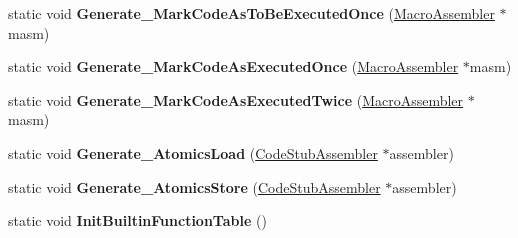 \begin{DoxyCompactItemize}
\item 
static void {\bfseries Generate\+\_\+\+Mark\+Code\+As\+To\+Be\+Executed\+Once} (\hyperlink{classv8_1_1internal_1_1_macro_assembler}{Macro\+Assembler} $\ast$masm)\hypertarget{classv8_1_1internal_1_1_builtins_a91a3f20e92eb67a9dd683c2821a882f8}{}\label{classv8_1_1internal_1_1_builtins_a91a3f20e92eb67a9dd683c2821a882f8}

\item 
static void {\bfseries Generate\+\_\+\+Mark\+Code\+As\+Executed\+Once} (\hyperlink{classv8_1_1internal_1_1_macro_assembler}{Macro\+Assembler} $\ast$masm)\hypertarget{classv8_1_1internal_1_1_builtins_a8fe483a8f1ceaeb2c528b5ad0d88cbf9}{}\label{classv8_1_1internal_1_1_builtins_a8fe483a8f1ceaeb2c528b5ad0d88cbf9}

\item 
static void {\bfseries Generate\+\_\+\+Mark\+Code\+As\+Executed\+Twice} (\hyperlink{classv8_1_1internal_1_1_macro_assembler}{Macro\+Assembler} $\ast$masm)\hypertarget{classv8_1_1internal_1_1_builtins_a51bc635c148f9d4f1185726024406027}{}\label{classv8_1_1internal_1_1_builtins_a51bc635c148f9d4f1185726024406027}

\item 
static void {\bfseries Generate\+\_\+\+Atomics\+Load} (\hyperlink{classv8_1_1internal_1_1_code_stub_assembler}{Code\+Stub\+Assembler} $\ast$assembler)\hypertarget{classv8_1_1internal_1_1_builtins_aeb3b6293a1168d24763e104c1b1b7d18}{}\label{classv8_1_1internal_1_1_builtins_aeb3b6293a1168d24763e104c1b1b7d18}

\item 
static void {\bfseries Generate\+\_\+\+Atomics\+Store} (\hyperlink{classv8_1_1internal_1_1_code_stub_assembler}{Code\+Stub\+Assembler} $\ast$assembler)\hypertarget{classv8_1_1internal_1_1_builtins_afc2496fa1ec41445ac348f38037a96b7}{}\label{classv8_1_1internal_1_1_builtins_afc2496fa1ec41445ac348f38037a96b7}

\item 
static void {\bfseries Init\+Builtin\+Function\+Table} ()\hypertarget{classv8_1_1internal_1_1_builtins_a22714bab73edbe55274c33694b9d1cd2}{}\label{classv8_1_1internal_1_1_builtins_a22714bab73edbe55274c33694b9d1cd2}

\end{DoxyCompactItemize}
